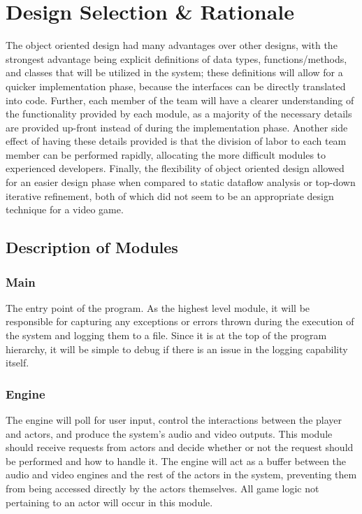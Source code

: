 \documentclass{article}
\begin{document}
\section{Design Selection \& Rationale}
The object oriented design had many advantages over other designs, with the strongest advantage being explicit definitions of data types, functions/methods, and classes that will be utilized in the system; these definitions will allow for a quicker implementation phase, because the interfaces can be directly translated into code. Further, each member of the team will have a clearer understanding of the functionality provided by each module, as a majority of the necessary details are provided up-front instead of during the implementation phase. Another side effect of having these details provided is that the division of labor to each team member can be performed rapidly, allocating the more difficult modules to experienced developers. Finally, the flexibility of object oriented design allowed for an easier design phase when compared to static dataflow analysis or top-down iterative refinement, both of which did not seem to be an appropriate design technique for a video game.

  \subsection{Description of Modules}
    \subsubsection{Main}
      The entry point of the program. As the highest level module, it will be responsible for capturing any exceptions or errors thrown during the execution of the system and logging them to a file. Since it is at the top of the program hierarchy, it will be simple to debug if there is an issue in the logging capability itself.
    \subsubsection{Engine}
      The engine will poll for user input, control the interactions between the player and actors, and produce the system's audio and video outputs. This module should receive requests from actors and decide whether or not the request should be performed and how to handle it. The engine will act as a buffer between the audio and video engines and the rest of the actors in the system, preventing them from being accessed directly by the actors themselves. All game logic not pertaining to an actor will occur in this module.
\end{document}
